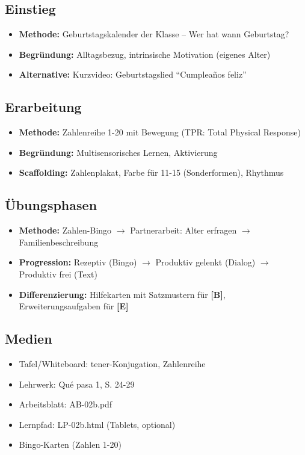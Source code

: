 \documentclass[11pt,a4paper]{article}
\newcommand{\lehrwerk}{Qué pasa 1}
\newcommand{\lehrwerkseite}{S. 24-29}
\newcommand{\B}{\textcolor{basis}{\textbf{[B]}}}
\newcommand{\E}{\textcolor{erweiterung}{\textbf{[E]}}}
\begin{document}
\subsection{Einstieg}
\begin{itemize}
    \item \textbf{Methode:} Geburtstagskalender der Klasse -- Wer hat wann Geburtstag?
    \item \textbf{Begründung:} Alltagsbezug, intrinsische Motivation (eigenes Alter)
    \item \textbf{Alternative:} Kurzvideo: Geburtstagslied ``Cumpleaños feliz''
\end{itemize}

\subsection{Erarbeitung}
\begin{itemize}
    \item \textbf{Methode:} Zahlenreihe 1-20 mit Bewegung (TPR: Total Physical Response)
    \item \textbf{Begründung:} Multisensorisches Lernen, Aktivierung
    \item \textbf{Scaffolding:} Zahlenplakat, Farbe für 11-15 (Sonderformen), Rhythmus
\end{itemize}

\subsection{Übungsphasen}
\begin{itemize}
    \item \textbf{Methode:} Zahlen-Bingo $\rightarrow$ Partnerarbeit: Alter erfragen $\rightarrow$ Familienbeschreibung
    \item \textbf{Progression:} Rezeptiv (Bingo) $\rightarrow$ Produktiv gelenkt (Dialog) $\rightarrow$ Produktiv frei (Text)
    \item \textbf{Differenzierung:} Hilfekarten mit Satzmustern für \B{}, Erweiterungsaufgaben für \E{}
\end{itemize}

\subsection{Medien}
\begin{itemize}
    \item Tafel/Whiteboard: tener-Konjugation, Zahlenreihe
    \item Lehrwerk: \lehrwerk, \lehrwerkseite
    \item Arbeitsblatt: AB-02b.pdf
    \item Lernpfad: LP-02b.html (Tablets, optional)
    \item Bingo-Karten (Zahlen 1-20)
\end{itemize}
\end{document}
